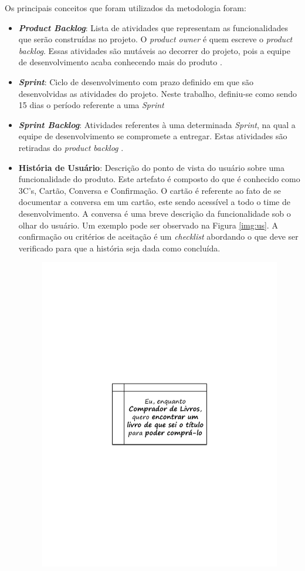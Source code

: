 Os principais conceitos que foram utilizados da metodologia foram:
\begin{itemize}
\item \textit{\textbf{Product Backlog}}: Lista de atividades que representam as funcionalidades que serão construídas no projeto. O \textit{product owner} é quem escreve o \textit{product backlog}. Essas atividades são mutáveis ao decorrer do projeto, pois a equipe de desenvolvimento acaba conhecendo mais do produto \cite{sabbagh_scrum:_2014}.
\item \textit{\textbf{Sprint}}: Ciclo de desenvolvimento com prazo definido em que são desenvolvidas as atividades do projeto. Neste trabalho, definiu-se como sendo 15 dias o período referente a uma \textit{Sprint}
\item \textit{\textbf{Sprint Backlog}}: Atividades referentes à uma determinada \textit{Sprint}, na qual a equipe de desenvolvimento se compromete a entregar. Estas atividades são retiradas do \textit{product backlog} \cite{mahnic_case_2011}.
\item \textbf{História de Usuário}: Descrição do ponto de vista do usuário sobre uma funcionalidade do produto. Este artefato é composto do que é conhecido como 3C's, Cartão, Conversa e Confirmação. O cartão é referente ao fato de se documentar a conversa em um cartão, este sendo acessível a todo o time de desenvolvimento. A conversa é uma breve descrição da funcionalidade sob o olhar do usuário. Um exemplo pode ser observado na Figura \ref{img:us}. A confirmação ou critérios de aceitação é um \textit{checklist} abordando o que deve ser verificado para que a história seja dada como concluída.
\graphicspath{{figuras/}}
\begin{figure}[H]
\centering
\includegraphics[scale=0.80]{US}

\end{figure}
\end{itemize}

